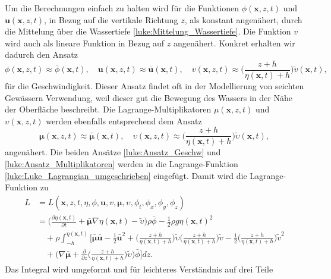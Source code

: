 Um die Berechnungen einfach zu halten wird für die Funktionen $\phi (\bm{x},z,t)$ und $\bm{u} (\bm{x},z,t)$, in Bezug auf die vertikale Richtung $z$, als konstant angenähert, durch die Mittelung über die Wassertiefe \eqref{luke:Mittelung_Wassertiefe}.
Die Funktion $v$ wird auch als lineare Funktion in Bezug auf $z$ angenähert. 
Konkret erhalten wir dadurch den Ansatz
\begin{equation}
\phi(\bm{x},z,t) \approx \bar{\phi}(\bm{x}, t),
\quad
\bm{u}(\bm{x},z,t) \approx \bar{\bm{u}}(\bm{x}, t),
\quad
v(\bm{x},z,t)
\approx
\biggl(\frac{z + h}{\eta(\bm{x}, t) + h}\biggr) \tilde{v}(\bm{x}, t),
\label{luke:Ansatz_Geschw}
\end{equation}
für die Geschwindigkeit.
Dieser Ansatz findet oft in der Modellierung von seichten Gewässern Verwendung, weil dieser gut die Bewegung des Wassers in der Nähe der Oberfläche beschreibt.
Die Lagrange-Multiplikatoren $\mu(\bm{x},z,t)$ und $\upsilon(\bm{x},z,t)$ werden ebenfalls entsprechend dem Ansatz
\begin{equation}
\bm{\mu}(\bm{x},z,t) \approx \bar{\bm{\mu}}(\bm{x}, t),
\quad
\upsilon(\bm{x},z,t)
\approx
\biggl(\frac{z + h}{\eta(\bm{x}, t) + h}\biggr)\tilde{\upsilon}(\bm{x}, t),
\label{luke:Ansatz_Multiplikatoren}
\end{equation}
angenähert.
Die beiden Ansätze \eqref{luke:Ansatz_Geschw} und \eqref{luke:Ansatz_Multiplikatoren} werden in die Lagrange-Funktion \eqref{luke:Luke_Lagrangian_umgeschrieben} eingefügt.
Damit wird die Lagrange-Funktion zu
\begin{align*}
L&=
L(\bm{x},z,t,\eta,\phi,\bm{u}, v, \bm{\mu},\upsilon,\phi_t,\phi_x,\phi_y,\phi_z)
\\
&=
\biggl(\frac{\partial \eta(\bm{x}, t)}{\partial t}
+
\bar{\bm{\mu}}  \nabla \eta(\bm{x}, t)
-
\widetilde{\upsilon}\biggr)\rho \bar{\phi}
-
\frac{1}{2} \rho g \eta(\bm{x}, t)^2
\\
&\quad+
\rho\int_{-h}^{\eta(\bm{x}, t)}
\bigg[ \bar{\bm{\mu}}  \bar{\bm{u}} - \frac{1}{2} \bar{\bm{u}}^2
+
\biggl(\frac{z + h}{\eta(\bm{x}, t) + h}\biggr)
\tilde{\upsilon}
\biggl(\frac{z + h}{\eta(\bm{x}, t) + h}\biggr)\tilde{v}
- \frac{1}{2} \biggl(\frac{z + h}{\eta(\bm{x}, t) + h}\biggr)\tilde{v}^2 
\\
&\quad+\biggl(\nabla \bar{\bm{\mu}}
+ \frac{\partial}{\partial z}
\biggl(\frac{z + h}{\eta(\bm{x}, t) + h}\biggr)\tilde{\upsilon}\biggr)
\bar{\phi} \bigg] dz.
\end{align*}
Das Integral wird umgeformt und für leichteres Verständnis auf drei Teile
